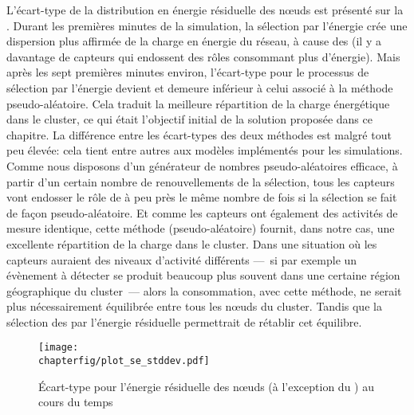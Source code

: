 L'écart-type de la distribution en énergie résiduelle des nœuds est présenté sur la .
Durant les premières minutes de la simulation, la sélection par l'énergie crée une dispersion plus affirmée de la charge en énergie du réseau, à cause des \vns (il y a davantage de capteurs qui endossent des rôles consommant plus d'énergie).
Mais après les sept premières minutes environ, l'écart-type pour le processus de sélection par l'énergie devient et demeure inférieur à celui associé à la méthode pseudo-aléatoire.
Cela traduit la meilleure répartition de la charge énergétique dans le cluster, ce qui était l'objectif initial de la solution proposée dans ce chapitre.
La différence entre les écart-types des deux méthodes est malgré tout peu élevée: cela tient entre autres aux modèles implémentés pour les simulations.
Comme nous disposons d'un générateur de nombres pseudo-aléatoires efficace, à partir d'un certain nombre de renouvellements de la sélection, tous les capteurs vont endosser le rôle de \cn à peu près le même nombre de fois si la sélection se fait de façon pseudo-aléatoire.
Et comme les capteurs ont également des activités de mesure identique, cette méthode (pseudo-aléatoire) fournit, dans notre cas, une excellente répartition de la charge dans le cluster.
Dans une situation où les capteurs auraient des niveaux d'activité différents ---~si par exemple un évènement à détecter se produit beaucoup plus souvent dans une certaine région géographique du cluster~--- alors la consommation, avec cette méthode, ne serait plus nécessairement équilibrée entre tous les nœuds du cluster.
Tandis que la sélection des \cns par l'énergie résiduelle permettrait de rétablir cet équilibre.

\begin{figure}[!b]
    \centering
    \texttt{[image: \\chapterfig/plot\_se\_stddev.pdf]}
    \caption[Écart-type pour l'énergie résiduelle des nœuds au cours du temps]{Écart-type pour l'énergie résiduelle des nœuds (à l'exception du \ch) au cours du temps}\label{se:fig:stddev}
\end{figure}
\pagebreak %

